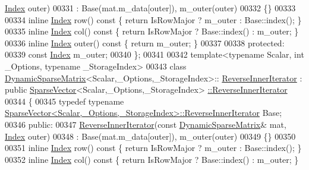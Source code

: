\begin{DoxyCode}
      \hyperlink{group___core___module_a554f30542cc2316add4b1ea0a492ff02}{Index} outer)
00331       : Base(mat.m\_data[outer]), m\_outer(outer)
00332     \{\}
00333 
00334     \textcolor{keyword}{inline} \hyperlink{group___core___module_a554f30542cc2316add4b1ea0a492ff02}{Index} row()\textcolor{keyword}{ const }\{ \textcolor{keywordflow}{return} IsRowMajor ? m\_outer : Base::index(); \}
00335     \textcolor{keyword}{inline} \hyperlink{group___core___module_a554f30542cc2316add4b1ea0a492ff02}{Index} col()\textcolor{keyword}{ const }\{ \textcolor{keywordflow}{return} IsRowMajor ? Base::index() : m\_outer; \}
00336     \textcolor{keyword}{inline} \hyperlink{group___core___module_a554f30542cc2316add4b1ea0a492ff02}{Index} outer()\textcolor{keyword}{ const }\{ \textcolor{keywordflow}{return} m\_outer; \}
00337 
00338   \textcolor{keyword}{protected}:
00339     \textcolor{keyword}{const} \hyperlink{group___core___module_a554f30542cc2316add4b1ea0a492ff02}{Index} m\_outer;
00340 \};
00341 
00342 \textcolor{keyword}{template}<\textcolor{keyword}{typename} Scalar, \textcolor{keywordtype}{int} \_Options, \textcolor{keyword}{typename} \_StorageIndex>
00343 \textcolor{keyword}{class }\hyperlink{class_eigen_1_1_dynamic_sparse_matrix}{DynamicSparseMatrix}<Scalar,\_Options,\_StorageIndex>::
      \hyperlink{class_eigen_1_1_dynamic_sparse_matrix_1_1_reverse_inner_iterator}{ReverseInnerIterator} : \textcolor{keyword}{public} \hyperlink{group___sparse_core___module_class_eigen_1_1_sparse_vector}{SparseVector}<Scalar,\_Options,\_StorageIndex>
      \hyperlink{class_eigen_1_1_dynamic_sparse_matrix_1_1_reverse_inner_iterator}{::ReverseInnerIterator}
00344 \{
00345     \textcolor{keyword}{typedef} \textcolor{keyword}{typename} 
      \hyperlink{class_eigen_1_1_sparse_compressed_base_1_1_reverse_inner_iterator}{SparseVector<Scalar,\_Options,\_StorageIndex>::ReverseInnerIterator}
       Base;
00346   \textcolor{keyword}{public}:
00347     \hyperlink{class_eigen_1_1_dynamic_sparse_matrix_1_1_reverse_inner_iterator}{ReverseInnerIterator}(\textcolor{keyword}{const} \hyperlink{class_eigen_1_1_dynamic_sparse_matrix}{DynamicSparseMatrix}& mat, 
      \hyperlink{group___core___module_a554f30542cc2316add4b1ea0a492ff02}{Index} outer)
00348       : Base(mat.m\_data[outer]), m\_outer(outer)
00349     \{\}
00350 
00351     \textcolor{keyword}{inline} \hyperlink{group___core___module_a554f30542cc2316add4b1ea0a492ff02}{Index} row()\textcolor{keyword}{ const }\{ \textcolor{keywordflow}{return} IsRowMajor ? m\_outer : Base::index(); \}
00352     \textcolor{keyword}{inline} \hyperlink{group___core___module_a554f30542cc2316add4b1ea0a492ff02}{Index} col()\textcolor{keyword}{ const }\{ \textcolor{keywordflow}{return} IsRowMajor ? Base::index() : m\_outer; \}

\end{DoxyCode}
